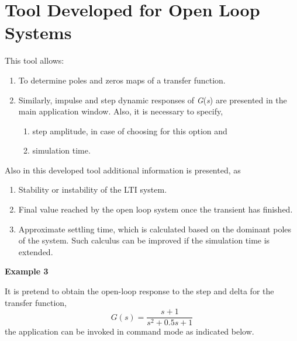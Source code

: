 \begin{enumerate}
	\end{enumerate}





\section{Tool Developed for Open Loop Systems}

This tool allows:
\begin{enumerate}
	\item To determine poles and zeros maps of a transfer function.
	\item Similarly, impulse and step dynamic responses of \textit{G}(\textit{s}) are presented in the main application window. Also, it is necessary to specify,
	\begin{enumerate}
		\item step amplitude, in case of choosing for this option and
		\item simulation time.
	\end{enumerate}
\end{enumerate}

Also in this developed tool additional information is presented, as
\begin{enumerate}
	\item Stability or instability of the LTI system.
	\item Final value reached by the open loop system once the transient has finished.
	\item Approximate settling time, which is calculated based on the dominant poles of the system. Such calculus can be improved if the simulation time is extended.
\end{enumerate}

\vspace{0.4cm}
\textbf{Example 3}

It is pretend to obtain the open-loop response to the step and delta for the transfer function,
\begin{equation}
	G(s)=\frac{s+1}{s^2+0.5s+1}
\end{equation}
the application can be invoked in command mode as indicated below.

